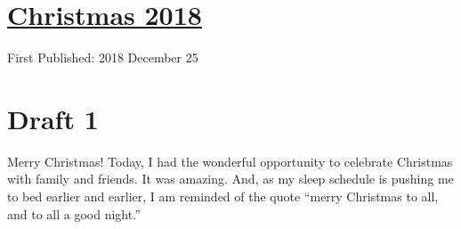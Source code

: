 \documentclass[12pt]{article}[titlepage]
\newcommand{\say}[1]{``#1''}
\newcommand{\1}{\={a}}
\newcommand{\2}{\={e}}
\newcommand{\3}{\={\i}}
\newcommand{\4}{\=o}
\newcommand{\5}{\=u}
\newcommand{\6}{\={A}}
\renewcommand{\,}{\textsuperscript{,}}
\begin{document}
\doublespacing
\section{\href{christmas-2018.html}{Christmas 2018}}
First Published: 2018 December 25
\section{Draft 1}
Merry Christmas!
Today, I had the wonderful opportunity to celebrate Christmas with family and friends.
It was amazing.
And, as my sleep schedule is pushing me to bed earlier and earlier, I am reminded of the quote \say{merry Christmas to all, and to all a good night.}
\end{document}
